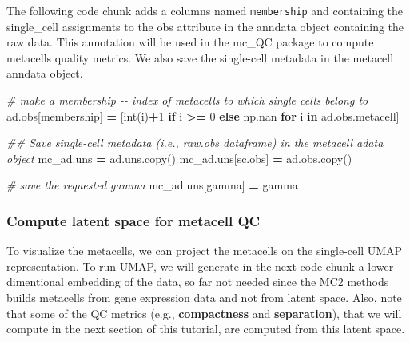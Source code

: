 \documentclass[
]{book}
\newenvironment{Shaded}{\begin{snugshade}}{\end{snugshade}}
\newcommand{\BuiltInTok}[1]{#1}
\newcommand{\CommentTok}[1]{\textcolor[rgb]{0.56,0.35,0.01}{\textit{#1}}}
\newcommand{\ControlFlowTok}[1]{\textcolor[rgb]{0.13,0.29,0.53}{\textbf{#1}}}
\newcommand{\DecValTok}[1]{\textcolor[rgb]{0.00,0.00,0.81}{#1}}
\newcommand{\KeywordTok}[1]{\textcolor[rgb]{0.13,0.29,0.53}{\textbf{#1}}}
\newcommand{\NormalTok}[1]{#1}
\newcommand{\OperatorTok}[1]{\textcolor[rgb]{0.81,0.36,0.00}{\textbf{#1}}}
\newcommand{\StringTok}[1]{\textcolor[rgb]{0.31,0.60,0.02}{#1}}
\begin{document}
The following code chunk adds a columns named \texttt{membership} and containing the single\_cell assignments to the obs attribute in the anndata object containing the raw data.
This annotation will be used in the mc\_QC package to compute metacells quality metrics. We also save the single-cell metadata in the metacell anndata object.

\begin{Shaded}
\begin{Highlighting}[]
\CommentTok{\# make a membership {-}{-} index of metacells to which single cells belong to }
\NormalTok{ad.obs[}\StringTok{\textquotesingle{}membership\textquotesingle{}}\NormalTok{] }\OperatorTok{=}\NormalTok{ [}\BuiltInTok{int}\NormalTok{(i)}\OperatorTok{+}\DecValTok{1} \ControlFlowTok{if}\NormalTok{ i }\OperatorTok{\textgreater{}=} \DecValTok{0} \ControlFlowTok{else}\NormalTok{ np.nan }\ControlFlowTok{for}\NormalTok{ i }\KeywordTok{in}\NormalTok{ ad.obs.metacell] }

\CommentTok{\#\# Save single{-}cell metadata (i.e., \textasciigrave{}raw.obs\textasciigrave{} dataframe) in the metacell adata object}
\NormalTok{mc\_ad.uns }\OperatorTok{=}\NormalTok{ ad.uns.copy()}
\NormalTok{mc\_ad.uns[}\StringTok{\textquotesingle{}sc.obs\textquotesingle{}}\NormalTok{] }\OperatorTok{=}\NormalTok{ ad.obs.copy()}

\CommentTok{\# save the requested gamma}
\NormalTok{mc\_ad.uns[}\StringTok{\textquotesingle{}gamma\textquotesingle{}}\NormalTok{] }\OperatorTok{=}\NormalTok{ gamma}
\end{Highlighting}
\end{Shaded}

\hypertarget{compute-latent-space-for-metacell-qc}{%
\subsubsection*{Compute latent space for metacell QC}\label{compute-latent-space-for-metacell-qc}}

To visualize the metacells, we can project the metacells on the single-cell UMAP representation. To run UMAP, we will generate in the next code chunk a lower-dimentional embedding of the data, so far not needed since the MC2 methods builds metacells from gene expression data and not from latent space.
Also, note that some of the QC metrics (e.g., \textbf{compactness} and \textbf{separation}), that we will compute in the next section of this tutorial, are computed from this latent space.
\end{document}
